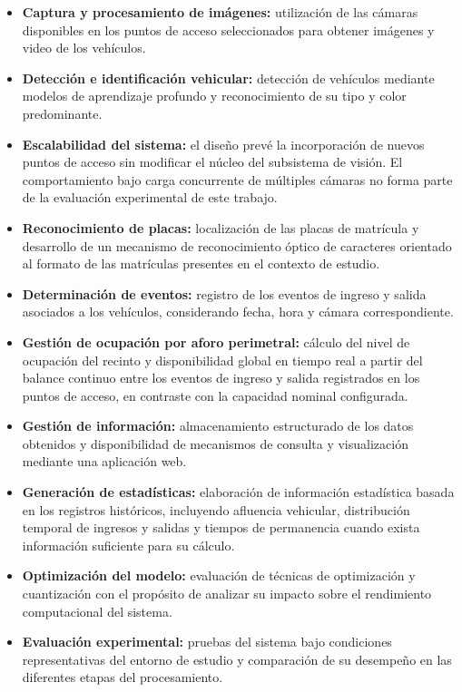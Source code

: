 \begin{itemize}
    \item
        \textbf{Captura y procesamiento de imágenes:} utilización de las cámaras
        disponibles en los puntos de acceso seleccionados para obtener imágenes y
        video de los vehículos.
    \item
        \textbf{Detección e identificación vehicular:} detección de vehículos
        mediante modelos de aprendizaje profundo y reconocimiento de su tipo y
        color predominante.
    \item
        \textbf{Escalabilidad del sistema:} el diseño prevé la incorporación de
        nuevos puntos de acceso sin modificar el núcleo del subsistema de visión.
        El comportamiento bajo carga concurrente de múltiples cámaras no forma
        parte de la evaluación experimental de este trabajo.
    \item
        \textbf{Reconocimiento de placas:} localización de las placas de
        matrícula y desarrollo de un mecanismo de reconocimiento óptico de
        caracteres orientado al formato de las matrículas presentes en el
        contexto de estudio.
    \item
        \textbf{Determinación de eventos:} registro de los eventos de ingreso y
        salida asociados a los vehículos, considerando fecha, hora y cámara
        correspondiente.
    \item
        \textbf{Gestión de ocupación por aforo perimetral:} cálculo del nivel de
        ocupación del recinto y disponibilidad global en tiempo real a partir del
        balance continuo entre los eventos de ingreso y salida registrados en los
        puntos de acceso, en contraste con la capacidad nominal configurada.
    \item
        \textbf{Gestión de información:} almacenamiento estructurado de los
        datos obtenidos y disponibilidad de mecanismos de consulta y
        visualización mediante una aplicación web.
    \item
        \textbf{Generación de estadísticas:} elaboración de información
        estadística basada en los registros históricos, incluyendo afluencia
        vehicular, distribución temporal de ingresos y salidas y tiempos de
        permanencia cuando exista información suficiente para su cálculo.
    \item
        \textbf{Optimización del modelo:} evaluación de técnicas de optimización
        y cuantización con el propósito de analizar su impacto sobre el
        rendimiento computacional del sistema.
    \item
        \textbf{Evaluación experimental:} pruebas del sistema bajo condiciones
        representativas del entorno de estudio y comparación de su desempeño en
        las diferentes etapas del procesamiento.
\end{itemize}

